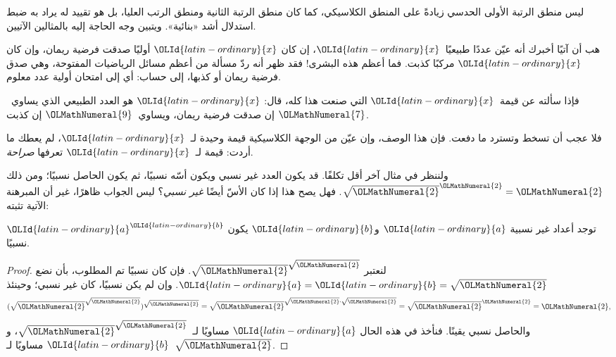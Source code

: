\documentclass[../../../include/open-logic-section]{subfiles}
\begin{document}


ليس منطق الرتبة الأولى الحدسي زيادةً على المنطق الكلاسيكي، كما
كان منطق الرتبة الثانية ومنطق الرتب العليا، بل هو تقييد له يراد به
ضبط استدلال أشد «بنائية». ويتبين وجه الحاجة إليه بالمثالين الآتيين.

هب أن آتيًا أخبرك أنه عيّن عددًا طبيعيًا~${\OLId{latin-ordinary}{x}}$، إن كان ${\OLId{latin-ordinary}{x}}$ أوليًا
صدقت فرضية ريمان، وإن كان ${\OLId{latin-ordinary}{x}}$ مركبًا كذبت. فما أعظم هذه البشرى!{}
فقد ظهر أنه ردّ مسألة من أعظم مسائل الرياضيات المفتوحة، وهي صدق
فرضية ريمان أو كذبها، إلى حساب: أي إلى امتحان أولية عدد معلوم.

فإذا سألته عن قيمة~${\OLId{latin-ordinary}{x}}$ التي صنعت هذا كله، قال: ${\OLId{latin-ordinary}{x}}$ هو العدد
الطبيعي الذي يساوي~${\OLMathNumeral{7}}$ إن صدقت فرضية ريمان، ويساوي~${\OLMathNumeral{9}}$ إن كذبت.

فلا عجب أن تسخط وتسترد ما دفعت. فإن هذا الوصف، وإن عيّن من الوجهة
الكلاسيكية قيمة وحيدة لـ~${\OLId{latin-ordinary}{x}}$، لم يعطك ما أردت: قيمة لـ~${\OLId{latin-ordinary}{x}}$
تعرفها \emph{صراحة}.

ولننظر في مثال آخر أقل تكلفًا. قد يكون العدد غير نسبي ويكون أسّه
نسبيًا، ثم يكون الحاصل نسبيًا؛ ومن ذلك $\sqrt{{\OLMathNumeral{2}}}^{\OLMathNumeral{2}} = {\OLMathNumeral{2}}$.
فهل يصح هذا إذا كان الأسّ أيضًا \emph{غير نسبي}؟ ليس الجواب
ظاهرًا، غير أن المبرهنة الآتية تثبته:

\begin{thm}
توجد أعداد غير نسبية ${\OLId{latin-ordinary}{a}}$ و${\OLId{latin-ordinary}{b}}$ يكون ${\OLId{latin-ordinary}{a}}^{\OLId{latin-ordinary}{b}}$ نسبيًا.
\end{thm}

\begin{proof}
لنعتبر $\sqrt{{\OLMathNumeral{2}}}^{\sqrt{{\OLMathNumeral{2}}}}$. فإن كان نسبيًا تم المطلوب،
بأن نضع ${\OLId{latin-ordinary}{a}} = {\OLId{latin-ordinary}{b}} = \sqrt{{\OLMathNumeral{2}}}$. وإن لم يكن نسبيًا، كان غير نسبي؛ وحينئذ
\[
(\sqrt{{\OLMathNumeral{2}}}^{\sqrt{{\OLMathNumeral{2}}}})^{\sqrt{{\OLMathNumeral{2}}}} = \sqrt{{\OLMathNumeral{2}}}^{\sqrt{{\OLMathNumeral{2}}} \cdot
  \sqrt{{\OLMathNumeral{2}}}} = \sqrt{{\OLMathNumeral{2}}}^{\OLMathNumeral{2}} = {\OLMathNumeral{2}},
\]
والحاصل نسبي يقينًا. فنأخذ في هذه الحال ${\OLId{latin-ordinary}{a}}$ مساويًا
لـ~$\sqrt{{\OLMathNumeral{2}}}^{\sqrt{{\OLMathNumeral{2}}}}$، و${\OLId{latin-ordinary}{b}}$ مساويًا لـ~$\sqrt {\OLMathNumeral{2}}$.
\end{proof}
\end{document}
